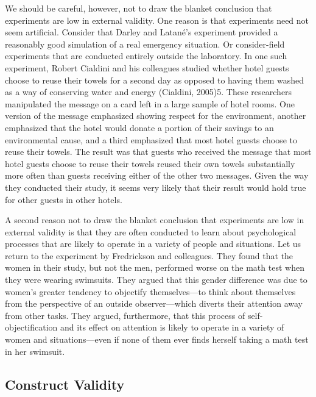  
We should be careful, however, not to draw the blanket conclusion that experiments are low in external validity. One reason is that experiments need not seem artificial. Consider that Darley and Latané's experiment provided a reasonably good simulation of a real emergency situation. Or consider-field experiments that are conducted entirely outside the laboratory. In one such experiment, Robert Cialdini and his colleagues studied whether hotel guests choose to reuse their towels for a second day as opposed to having them washed as a way of conserving water and energy (Cialdini, 2005)5. These researchers manipulated the message on a card left in a large sample of hotel rooms. One version of the message emphasized showing respect for the environment, another emphasized that the hotel would donate a portion of their savings to an environmental cause, and a third emphasized that most hotel guests choose to reuse their towels. The result was that guests who received the message that most hotel guests choose to reuse their towels reused their own towels substantially more often than guests receiving either of the other two messages. Given the way they conducted their study, it seems very likely that their result would hold true for other guests in other hotels.
 
 
A second reason not to draw the blanket conclusion that experiments are low in external validity is that they are often conducted to learn about psychological processes that are likely to operate in a variety of people and situations. Let us return to the experiment by Fredrickson and colleagues. They found that the women in their study, but not the men, performed worse on the math test when they were wearing swimsuits. They argued that this gender difference was due to women's greater tendency to objectify themselves---to think about themselves from the perspective of an outside observer---which diverts their attention away from other tasks. They argued, furthermore, that this process of self-objectification and its effect on attention is likely to operate in a variety of women and situations---even if none of them ever finds herself taking a math test in her swimsuit.
 
 
\subsection{Construct Validity}
 
 

